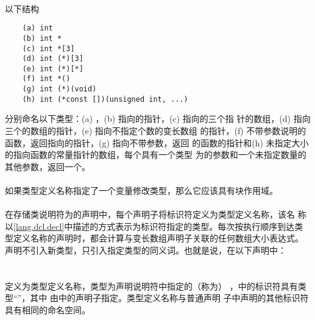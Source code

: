 {\paragraph{}
\ex* 以下结构
\begin{lstlisting}
    (a) int
    (b) int *
    (c) int *[3]
    (d) int (*)[3]
    (e) int (*)[*]
    (f) int *()
    (g) int (*)(void)
    (h) int (*const [])(unsigned int, ...)
\end{lstlisting}
分别命名以下类型：(a) ，(b) 指向的指针，(c) 指向的三个指
针的数组，(d) 指向三个的数组的指针，(e) 指向不指定个数的变长数组
的指针，(f) 不带参数说明的函数，返回指向的指针，(g) 指向不带参数，返回
的函数的指针和(h) 未指定大小的指向函数的常量指针的数组，每个具有一个类型
为的参数和一个未指定数量的其他参数，返回一个。

\syntax
\paragraph{}

\constraint
\paragraph{}
如果类型定义名称指定了一个变量修改类型，那么它应该具有块作用域。

\semantic
\paragraph{}
在存储类说明符为的声明中，每个声明子将标识符定义为类型定义名称，该名
称以\ref{lang.dcl.decl}中描述的方式表示为标识符指定的类型。每次按执行顺序到达类
型定义名称的声明时，都会计算与变长数组声明子关联的任何数组大小表达式。
声明不引入新类型，只引入指定类型的同义词。也就是说，在以下声明中：\\
\mbox{\hspace{4em}}                                \\
\mbox{\hspace{4em}}                                        \\
定义为类型定义名称，类型为声明说明符中指定的（称为）
，中的标识符具有类型``”，其中
由中的声明子指定。类型定义名称与普通声明
子中声明的其他标识符具有相同的命名空间。

}
